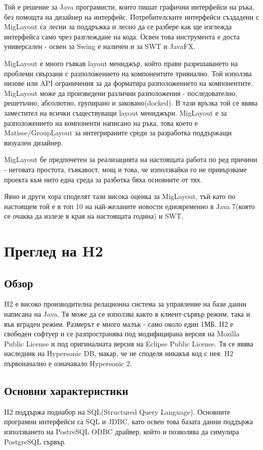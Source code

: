 Той е решение за Java програмисти, които пишат графични интерфейси на
ръка, без помощта на дизайнер на интерфейс. Потребителските интерфейси
създадени с MigLayout са лесни за поддръжка и лесно да се разбере как
ще изглежда интерфейса само чрез разглеждане на кода. Освен това
инструмента е доста универсален - освен за Swing е наличен и за SWT и
JavaFX. 

MigLayout е много гъвкав layout мениджър, който прави разрешаването на
проблеми свързани с разположението на компонентите тривиално. Той
използва низове или API ограничения за да форматира разположението на
компонентите. MigLayout може да произведени различни разположения -
последователно, решетъчно, абсолютно, групирано и заковано(docked). В
тази връзка той се явява заместител на всички съществуващи layout
мениджъри. MigLayout е за разположението на компоненти написано на
ръка, това което е Matisse/GroupLayout за интегрираните среди за
разработка поддържащи визуален дизайнер.

MigLayout бе предпочетен за реализацията на настоящата работа по ред
причини - неговата простота, гъвкавост, мощ и това, че използвайки го
не привързваме проекта към нито една среда за разботка бяха основните
от тях.

Явно и други хора споделят тази висока оценка за MigLayout, тъй като
по настоящем той е в топ 10 на най-желаните новости едновременно в
Java 7(която се очаква да излезе в края на настоящата година) и SWT.
\section{Преглед на H2}
\subsection{Обзор}
H2 е високо производителна релационна система за управление на бази
данни написана на Java. Тя може да се използва както в клиент-сървър
режим, така и във вграден режим. Размерът е много малък - само около
един 1МБ. H2 е свободен софтуер и се разпространява под модифицирана
версия на Mozilla Public License и под оригиналната версия на Eclipse
Public License. Тя се явява наследник на Hypersonic DB, макар, че не
споделя никакъв код с нея. H2 първоначално е означавало Hypersonic 2.

\subsection{Основни характеристики}
H2 поддържа поднабор на SQL(Structured Query Language). Основните
програмни интерфейси са SQL и JDBC, като освен това базата данни
поддържа използването на PostreSQL ODBC драйвер, който и позволява да
симулира PostgreSQL сървър.

